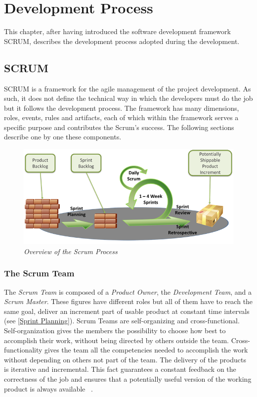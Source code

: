 \chapter{Development Process}
This chapter, after having introduced the software development framework SCRUM, describes the development process adopted during the development.

	\section{SCRUM}
	SCRUM is a framework for the agile management of the project development. 
	As such, it does not define the technical way in which the developers must do the job but it follows the development process. 	
	The framework has many dimensions, roles, events, rules and artifacts, each of which within the framework serves a specific purpose and contributes the Scrum's success. The following sections describe one by one these components.

	\begin{figure}[h]
	  \begin{center} 
	    \includegraphics[scale=0.45]{images/ch_04/scrum_overview.png}
	  \end{center} 
	  \caption{\textit{Overview of the Scrum Process}}  
	  \label{fig:ScrumOverview}
  	\end{figure}


		\subsection{The Scrum Team}
		The \emph{Scrum Team} is composed of a \emph{Product Owner}, the \emph{Development Team}, and a \emph{Scrum Master}.
		These figures have different roles but all of them have to reach the same goal, deliver an increment part of usable product at constant time intervals (see \ref{Sprint Planning}). Scrum Teams are self-organizing and cross-functional. Self-organization gives the members the possibility to choose how best to accomplish their work, without being directed by others outside the team. Cross-functionality gives the team all the competencies needed to accomplish the work without depending on others not part of the team. The delivery of the products is iterative and incremental. This fact guarantees a constant feedback on the correctness of the job and ensures that a potentially useful version of the working product is always available ~\cite{scrumEnglishGuide}.


